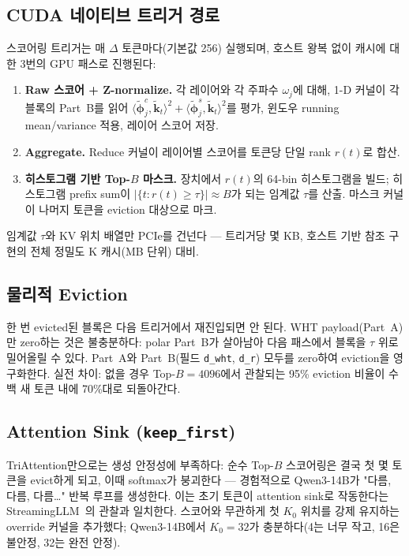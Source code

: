 \documentclass[10pt,twocolumn]{article}
\begin{document}
\subsection{CUDA 네이티브 트리거 경로}

스코어링 트리거는 매 $\Delta$ 토큰마다(기본값 256) 실행되며, 호스트 왕복 없이 캐시에 대한 3번의 GPU 패스로 진행된다:

\begin{enumerate}[leftmargin=*,topsep=2pt,itemsep=1pt]
\item \textbf{Raw 스코어 + Z-normalize.} 각 레이어와 각 주파수 $\omega_j$에 대해, 1-D 커널이 각 블록의 Part~B를 읽어 $\langle \tilde{\boldsymbol{\phi}}^c_j, \tilde{\mathbf{k}}_t \rangle^2 + \langle \tilde{\boldsymbol{\phi}}^s_j, \tilde{\mathbf{k}}_t \rangle^2$를 평가, 윈도우 running mean/variance 적용, 레이어 스코어 저장.
\item \textbf{Aggregate.} Reduce 커널이 레이어별 스코어를 토큰당 단일 rank $r(t)$로 합산.
\item \textbf{히스토그램 기반 Top-$B$ 마스크.} 장치에서 $r(t)$의 64-bin 히스토그램을 빌드; 히스토그램 prefix sum이 $|\{t : r(t) \geq \tau\}| \approx B$가 되는 임계값 $\tau$를 산출. 마스크 커널이 나머지 토큰을 eviction 대상으로 마크.
\end{enumerate}

임계값 $\tau$와 KV 위치 배열만 PCIe를 건넌다 --- 트리거당 몇 KB, 호스트 기반 참조 구현의 전체 정밀도 K 캐시(MB 단위) 대비.

\subsection{물리적 Eviction}

한 번 evicted된 블록은 다음 트리거에서 재진입되면 안 된다. WHT payload(Part~A)만 zero하는 것은 불충분하다: polar Part~B가 살아남아 다음 패스에서 블록을 $\tau$ 위로 밀어올릴 수 있다. Part~A와 Part~B(필드 \texttt{d\_wht}, \texttt{d\_r}) 모두를 zero하여 eviction을 영구화한다. 실전 차이: 없을 경우 Top-$B = 4096$에서 관찰되는 95\% eviction 비율이 수백 새 토큰 내에 70\%대로 되돌아간다.

\subsection{Attention Sink (\texttt{keep\_first})}

TriAttention만으로는 생성 안정성에 부족하다: 순수 Top-$B$ 스코어링은 결국 첫 몇 토큰을 evict하게 되고, 이때 softmax가 붕괴한다 --- 경험적으로 Qwen3-14B가 "다름, 다름, 다름\ldots" 반복 루프를 생성한다. 이는 초기 토큰이 attention sink로 작동한다는 StreamingLLM~\cite{streamingllm2023}의 관찰과 일치한다. 스코어와 무관하게 첫 $K_0$ 위치를 강제 유지하는 override 커널을 추가했다; Qwen3-14B에서 $K_0 = 32$가 충분하다(4는 너무 작고, 16은 불안정, 32는 완전 안정).
\end{document}
